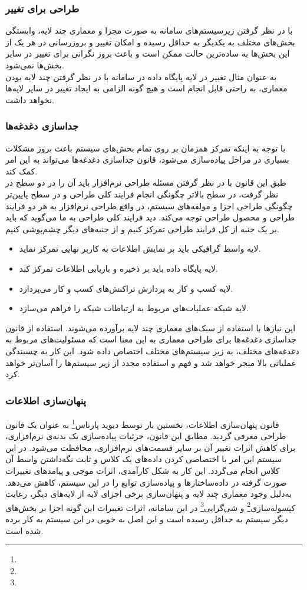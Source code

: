 \documentclass[12pt]{article}
\begin{document}
	\subsubsection{طراحی برای تغییر}
	با در نظر گرفتن زیرسیستم‌های سامانه به صورت مجزا و معماری چند لایه، وابستگی بخش‌های مختلف به یکدیگر به حداقل رسیده و امکان تغییر و بروزرسانی در هر یک از این بخش‌ها به ساده‌ترین حالت ممكن است و باعث بروز نگرانی برای تغییر در سایر بخش‌ها نمی‌شود.\\
	به عنوان مثال تغییر در لایه پایگاه داده در سامانه با در نظر گرفتن چند لایه بودن معماری، به راحتی قابل انجام است و هیچ گونه الزامی به ایجاد تغییر در سایر لایه‌ها نخواهد داشت.
	\subsubsection{جداسازی دغدغه‌ها}
	با توجه به اینکه تمرکز همزمان بر روی تمام بخش‌های سیستم باعث بروز مشکلات بسیاری در مراحل پیاده‌سازی می‌شود، قانون جداسازی ‌دغدغه‌ها می‌تواند به این امر کمک کند.\\
	طبق این قانون با در نظر گرفتن مسئله طراحی نرم‌افزار باید آن را در دو سطح در نظر گرفت، در سطح بالاتر چگونگی انجام فرایند کلی طراحی و در سطح پایین‌تر چگونگی طراحی اجزا و مولفه‌های سیستم، در واقع طراحی نرم‌افزار به هر دو فرایند طراحی و محصول طراحی توجه می‌کند. دید فرایند کلی طراحی به ما می‌گوید که باید بر یک جنبه از کل فرایند طراحی تمرکز کنیم و از جنبه‌های دیگر چشم‌پوشی کنیم.

	\begin{itemize}
		\item
		لایه واسط گرافیکی باید بر نمایش اطلاعات به کاربر نهایی تمرکز نماید.
		\item
		لایه پایگاه داده باید بر ذخیره و بازیابی اطلاعات تمرکز کند.
		\item
		لایه کسب و کار به پردازش تراکنش‌های کسب و کار می‌پردازد.
		\item
		لایه شبکه عملیات‌های مربوط به ارتباطات شبکه را فراهم می‌سازد.
	\end{itemize}
	این نیازها با استفاده از سبک‌های معماری چند لایه برآورده می‌شوند. استفاده از قانون جداسازی دغدغه‌ها برای طراحی معماری به این معنا است که مسئولیت‌های مربوط به دغدغه‌های مختلف، به زیر سیستم‌های مختلف اختصاص داده شود. این کار به چسبندگی عملیاتی بالا منجر خواهد شد و فهم و استفاده مجدد از زیر سیستم‌ها را آسان‌تر خواهد کرد.
	\subsubsection{پنهان‌سازی اطلاعات}
	قانون پنهان‌سازی اطلاعات، نخستین بار توسط دیوید پارناس\footnote{} به عنوان یک قانون طراحی معرفی گردید. مطابق این قانون، جزئیات پیاده‌سازی یک بدنه‌ی نرم‌افزاری، برای کاهش اثرات تغییر آن بر سایر قسمت‌های نرم‌افزاری، محافظت می‌شود. در این سیستم این امر با اختصاصی کردن داده‌های یک کلاس و ثابت نگه‌داشتن واسط آن کلاس انجام می‌‌گردد. این کار به شکل کارآمدی، اثرات موجی و پیامدهای تغییرات صورت گرفته در داده‌ساختارها و پیاده‌سازی توابع را در این سیستم، کاهش می‌دهد. به‌دلیل وجود معماری چند لایه و پنهان‌سازی برخی اجزای لایه از لایه‌های دیگر، رعایت کپسوله‌سازی\footnote{} و شی‌گرایی\footnote{} در این سامانه، اثرات تغییرات این گونه اجزا بر بخش‌های دیگر سیستم به حداقل رسیده است و این اصل به خوبی در این سیستم به کار برده شده است.
\end{document}
